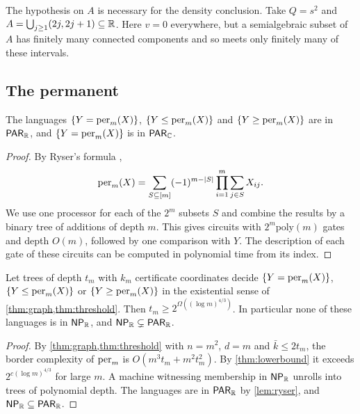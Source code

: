 The hypothesis on $A$ is necessary for the density conclusion. Take $Q=s^2$ and $A=\bigcup_{j\ge1}(2j,2j+1)\subseteq\mathbb{R}$. Here $v=0$ everywhere, but a semialgebraic subset of $A$ has finitely many connected components and so meets only finitely many of these intervals.

\subsection{The permanent}

\begin{lemma}\label{lem:ryser}
The languages $\{Y=\operatorname{per}_m(X)\}$, $\{Y\le\operatorname{per}_m(X)\}$ and $\{Y\ge\operatorname{per}_m(X)\}$ are in $\textsf{\upshape PAR}_{\mathbb{R}}$, and $\{Y=\operatorname{per}_m(X)\}$ is in $\textsf{\upshape PAR}_{\mathbb{C}}$.
\end{lemma}

\begin{proof}
By Ryser's formula \cite{Rys63},
\[
\operatorname{per}_m(X)=\sum_{S\subseteq[m]}(-1)^{m-|S|}\prod_{i=1}^m\sum_{j\in S}X_{ij}.
\]
We use one processor for each of the $2^m$ subsets $S$ and combine the results by a binary tree of additions of depth $m$. This gives circuits with $2^m\mathrm{poly}(m)$ gates and depth $O(m)$, followed by one comparison with $Y$. The description of each gate of these circuits can be computed in polynomial time from its index.
\end{proof}

\begin{corollary}\label{cor:np}
Let trees of depth $t_m$ with $k_m$ certificate coordinates decide $\{Y=\operatorname{per}_m(X)\}$, $\{Y\le\operatorname{per}_m(X)\}$ or $\{Y\ge\operatorname{per}_m(X)\}$ in the existential sense of \cref{thm:graph,thm:threshold}. Then $t_m\ge2^{\Omega((\log m)^{4/3})}$. In particular none of these languages is in $\textsf{\upshape NP}_{\mathbb{R}}$, and $\textsf{\upshape NP}_{\mathbb{R}}\subsetneq\textsf{\upshape PAR}_{\mathbb{R}}$.
\end{corollary}

\begin{proof}
By \cref{thm:graph,thm:threshold} with $n=m^2$, $d=m$ and $\bar k\le2t_m$, the border complexity of $\operatorname{per}_m$ is $O(m^3t_m+m^2t_m^2)$. By \cref{thm:lowerbound} it exceeds $2^{c(\log m)^{4/3}}$ for large $m$. A machine witnessing membership in $\textsf{\upshape NP}_{\mathbb{R}}$ unrolls into trees of polynomial depth. The languages are in $\textsf{\upshape PAR}_{\mathbb{R}}$ by \cref{lem:ryser}, and $\textsf{\upshape NP}_{\mathbb{R}}\subseteq\textsf{\upshape PAR}_{\mathbb{R}}$.
\end{proof}
